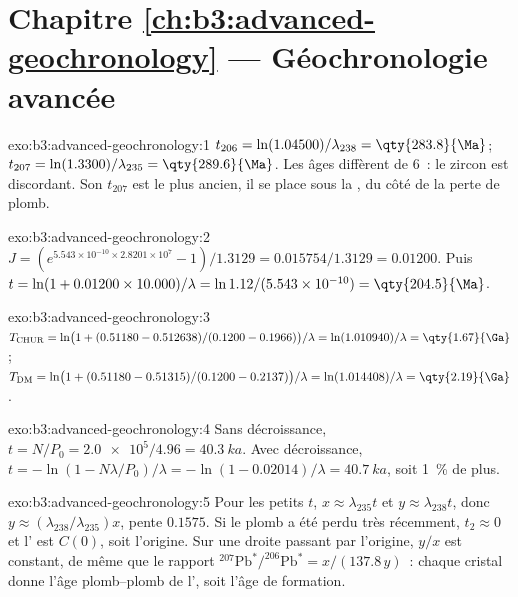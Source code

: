 \section*{Chapitre \ref{ch:b3:advanced-geochronology} --- Géochronologie avancée}

\begin{solution}{exo:b3:advanced-geochronology:1}
$t_{206} = \ln(1.04500)/\lambda_{238} = \qty{283.8}{\Ma}$; $t_{207} =
\ln(1.3300)/\lambda_{235} = \qty{289.6}{\Ma}$. Les âges diffèrent de
\qty{6}{\Ma}~: le zircon est discordant. Son $t_{207}$ est le plus ancien, il se place
sous la , du côté de la perte de plomb.
\end{solution}

\begin{solution}{exo:b3:advanced-geochronology:2}
$J = (e^{5.543\times10^{-10}\times2.8201\times10^7} - 1)/1.3129 =
0.015754/1.3129 = 0.01200$. Puis $t = \ln(1 + 0.01200\times10.000)/\lambda =
\ln 1.12/(5.543\times10^{-10}) = \qty{204.5}{\Ma}$.
\end{solution}

\begin{solution}{exo:b3:advanced-geochronology:3}
$T_{\mathrm{CHUR}} = \ln\bigl(1 + (0.51180 - 0.512638)/(0.1200 -
0.1966)\bigr)/\lambda = \ln(1.010940)/\lambda = \qty{1.67}{\Ga}$;
$T_{\mathrm{DM}} = \ln\bigl(1 + (0.51180 - 0.51315)/(0.1200 - 0.2137)\bigr)/\lambda
= \ln(1.014408)/\lambda = \qty{2.19}{\Ga}$.
\end{solution}

\begin{solution}{exo:b3:advanced-geochronology:4}
Sans décroissance, $t = N/P_0 = \num{2.0e5}/4.96 = \qty{40.3}{ka}$. Avec décroissance,
$t = -\ln(1 - N\lambda/P_0)/\lambda = -\ln(1 - 0.02014)/\lambda =
\qty{40.7}{ka}$, soit \qty{1}{\percent} de plus.
\end{solution}

\begin{solution}{exo:b3:advanced-geochronology:5}
Pour les petits $t$, $x \approx \lambda_{235}t$ et $y \approx \lambda_{238}t$, donc
$y \approx (\lambda_{238}/\lambda_{235})x$, pente $0.1575$. Si le plomb a été
perdu très récemment, $t_2 \approx 0$ et l' est $C(0)$,
soit l'origine. Sur une droite passant par l'origine, $y/x$ est constant, de même que le rapport
$^{207}\mathrm{Pb}^*/^{206}\mathrm{Pb}^* = x/(137.8\,y)$~: chaque cristal donne
l'âge plomb--plomb de l', soit l'âge de formation.
\end{solution}

